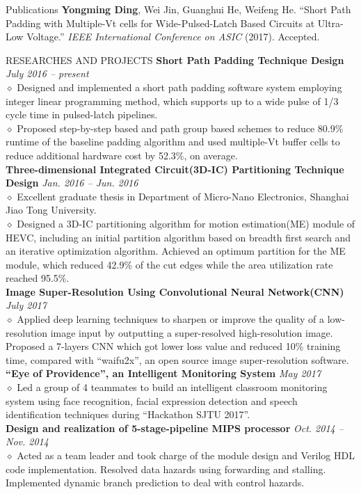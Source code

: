 \documentclass{resume} %
\begin{document}
\begin{rSection}{Publications}
\textbf{Yongming Ding}, Wei Jin, Guanghui He, Weifeng He. ``Short Path Padding with Multiple-Vt cells for Wide-Pulsed-Latch Based Circuits at Ultra-Low Voltage.'' \emph{IEEE International Conference on ASIC}  (2017). Accepted.
\end{rSection}

\begin{rSection}{RESEARCHES AND PROJECTS}
\textbf{Short Path Padding Technique Design} \hfill \emph{July 2016 -- present}
\\$\diamond$ Designed and implemented a short path padding software system employing integer linear programming method, which supports up to a wide pulse of 1/3 cycle time in pulsed-latch pipelines.
\\$\diamond$ Proposed step-by-step based and path group based schemes to reduce 80.9\% runtime of the baseline padding algorithm and used multiple-Vt buffer cells to reduce additional hardware cost by 52.3\%, on average. 
\\\textbf{Three-dimensional Integrated Circuit(3D-IC) Partitioning Technique Design} \hfill \emph{Jan. 2016 -- Jun. 2016}
\\$\diamond$ Excellent graduate thesis in Department of Micro-Nano Electronics, Shanghai Jiao Tong University.
\\$\diamond$ Designed a 3D-IC partitioning algorithm for motion estimation(ME) module of HEVC, including an initial partition algorithm based on breadth first search and an iterative optimization algorithm. Achieved an optimum partition for the ME module, which reduced 42.9\% of the cut edges while the area utilization rate reached 95.5\%.
\\\textbf{Image Super-Resolution Using Convolutional Neural Network(CNN)} \hfill \emph{July 2017}
\\$\diamond$  Applied deep learning techniques to sharpen or improve the quality of a low-resolution image input by outputting a super-resolved high-resolution image. Proposed a 7-layers CNN which got lower loss value and reduced 10\% training time, compared with ``waifu2x'', an open source image super-resolution software.
\\\textbf{``Eye of Providence'', an Intelligent Monitoring System} \hfill \emph{May 2017}
\\$\diamond$ Led a group of 4 teammates to build an intelligent classroom monitoring system using face recognition, facial expression detection and speech identification techniques during ``Hackathon SJTU 2017''.
\\\textbf{Design and realization of 5-stage-pipeline MIPS processor} \hfill \emph{Oct. 2014 -- Nov. 2014}
\\$\diamond$  Acted as a team leader and took charge of the module design and Verilog HDL code implementation. Resolved data hazards using forwarding and stalling. Implemented dynamic branch prediction to deal with control hazards.
\end{rSection}
\end{document}
